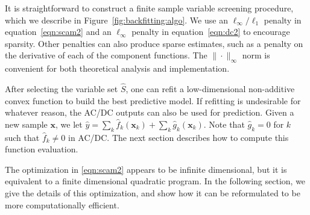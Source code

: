 It is straightforward to construct a finite sample variable screening procedure, which we describe in Figure~\ref{fig:backfitting:algo}.
We use an $\ell_\infty/\ell_1$ penalty in equation~\eqref{eqn:scam2}
and an $\ell_\infty$ penalty in equation~\eqref{eqn:dc2} to encourage
sparsity.  Other penalties can also produce
sparse estimates, such as a penalty on the derivative of each of the
component functions.  The $\|\cdot\|_\infty$ norm is convenient for both
theoretical analysis and implementation.

After selecting the variable set $\hat{S}$, one can refit a
low-dimensional non-additive convex function to build the best
predictive model. If refitting is undesirable for whatever reason, the
AC/DC outputs can also be used for prediction. Given a new sample
$\mathbf{x}$, we let $\hat{y} = \sum_k \hat{f}_k(\mathbf{x}_k) +
\sum_k \hat{g}_k(\mathbf{x}_k)$. Note that $\hat{g}_k = 0$ for $k$
such that $\hat{f}_k \neq 0$ in AC/DC. The next section describes how
to compute this function evaluation.

The optimization in \eqref{eqn:scam2} appears to be infinite
dimensional, but it is equivalent to a finite dimensional quadratic
program.  In the following section, we give the details
of this optimization, and show how it can be reformulated
to be more computationally efficient.



